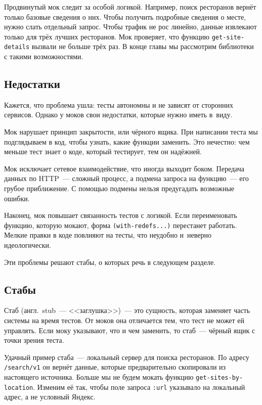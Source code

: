 Продвинутый мок следит за особой логикой. Например, поиск ресторанов вернёт
только базовые сведения о них. Чтобы получить подробные сведения о месте, нужно
слать отдельный запрос. Чтобы трафик не рос линейно, данные извлекают только для
трёх лучших ресторанов. Мок проверяет, что функцию \verb|get-site-details|
вызвали не больше трёх раз. В конце главы мы рассмотрим библиотеки с такими
возможностями.

\subsection{Недостатки}

Кажется, что проблема ушла: тесты автономны и не зависят от сторонних
сервисов. Однако у моков свои недостатки, которые нужно иметь в~виду.

Мок нарушает принцип закрытости, или чёрного ящика. При написании теста мы
подглядываем в код, чтобы узнать, какие функции заменить. Это нечестно: чем
меньше тест знает о коде, который тестирует, тем он надёжней.

Мок исключает сетевое взаимодействие, что иногда выходит боком. Передача данных
по HTTP~--- сложный процесс, а подмена запроса на функцию~--- его грубое
приближение. С помощью подмены нельзя предугадать возможные ошибки.

Наконец, мок повышает связанность тестов с логикой. Если переименовать функцию,
которую мокают, форма \verb|(with-redefs...)| перестанет работать. Мелкие правки
в коде повлияют на тесты, что неудобно и~неверно идеологически.

Эти проблемы решают стабы, о которых речь в следующем разделе.

\iflarge\vspace{15mm}\pagebreak[4]\fi

\subsection{Стабы}


Стаб (англ.~stub~--- <<заглушка>>)~--- это сущность, которая заменяет часть
системы на время тестов. От моков она отличается тем, что тест не может ей
управлять. Если моку указывают, что и чем заменить, то стаб~--- чёрный ящик с
точки зрения теста.

Удачный пример стаба~--- локальный сервер для поиска ресторанов. По адресу
\verb|/search/v1| он вернёт данные, которые предварительно скопировали из
настоящего источника. Больше мы не будем мокать функцию
\verb|get-sites-by-location|. Изменим её так, чтобы поле запроса \verb|:url|
указывало на локальный адрес, а не условный Яндекс.

